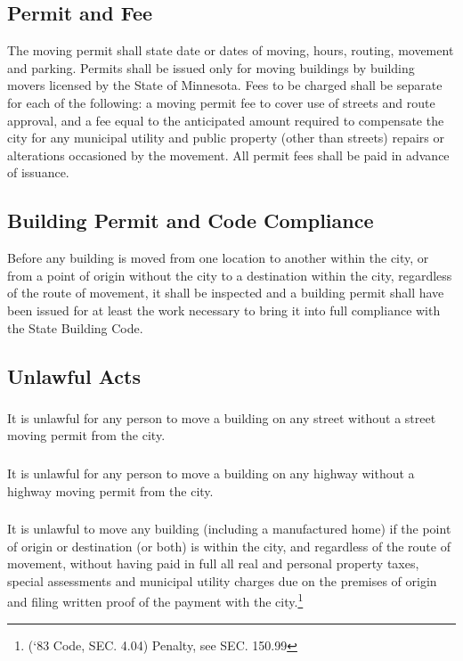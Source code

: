 \subsection{Permit and Fee}
The moving permit shall state date or dates of moving, hours, routing, movement and parking. Permits shall be issued only for moving buildings by building movers licensed by the State of Minnesota. Fees to be charged shall be separate for each of the following: a moving permit fee to cover use of streets and route approval, and a fee equal to the anticipated amount required to compensate the city for any municipal utility and public property (other than streets) repairs or alterations occasioned by the movement. All permit fees shall be paid in advance of issuance.
\subsection{Building Permit and Code Compliance}
Before any building is moved from one location to another within the city, or from a point of origin without the city to a destination within the city, regardless of the route of movement, it shall be inspected and a building permit shall have been issued for at least the work necessary to bring it into full compliance with the State Building Code.
\subsection{Unlawful Acts}
\subsubsection{}
It is unlawful for any person to move a building on any street without a street moving permit from the city.
\subsubsection{}
It is unlawful for any person to move a building on any highway without a highway moving permit from the city.
\subsubsection{}
It is unlawful to move any building (including a manufactured home) if the point of origin or destination (or both) is within the city, and regardless of the route of movement, without having paid in full all real and personal property taxes, special assessments and municipal utility charges due on the premises of origin and filing written proof of the payment with the city.\footnote{(‘83 Code, SEC. 4.04)  Penalty, see SEC. 150.99}

